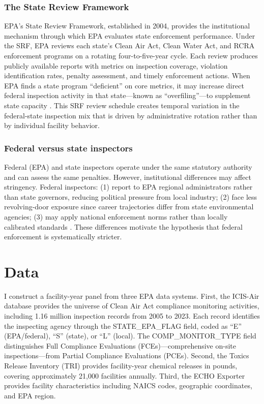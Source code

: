 \documentclass[12pt]{article}
\begin{document}
\subsubsection*{The State Review Framework} EPA's State Review Framework, established in 2004, provides the institutional mechanism through which EPA evaluates state enforcement performance. Under the SRF, EPA reviews each state's Clean Air Act, Clean Water Act, and RCRA enforcement programs on a rotating four-to-five-year cycle. Each review produces publicly available reports with metrics on inspection coverage, violation identification rates, penalty assessment, and timely enforcement actions. When EPA finds a state program ``deficient'' on core metrics, it may increase direct federal inspection activity in that state---known as ``overfiling''---to supplement state capacity \citep{gaynor2016cooperative}. This SRF review schedule creates temporal variation in the federal-state inspection mix that is driven by administrative rotation rather than by individual facility behavior.

\subsubsection*{Federal versus state inspectors} Federal (EPA) and state inspectors operate under the same statutory authority and can assess the same penalties. However, institutional differences may affect stringency. Federal inspectors: (1) report to EPA regional administrators rather than state governors, reducing political pressure from local industry; (2) face less revolving-door exposure since career trajectories differ from state environmental agencies; (3) may apply national enforcement norms rather than locally calibrated standards \citep{mintz2012enforcement}. These differences motivate the hypothesis that federal enforcement is systematically stricter.


\section{Data}

I construct a facility-year panel from three EPA data systems. First, the ICIS-Air database provides the universe of Clean Air Act compliance monitoring activities, including 1.16 million inspection records from 2005 to 2023. Each record identifies the inspecting agency through the STATE\_EPA\_FLAG field, coded as ``E'' (EPA/federal), ``S'' (state), or ``L'' (local). The COMP\_MONITOR\_TYPE field distinguishes Full Compliance Evaluations (FCEs)---comprehensive on-site inspections---from Partial Compliance Evaluations (PCEs). Second, the Toxics Release Inventory (TRI) provides facility-year chemical releases in pounds, covering approximately 21,000 facilities annually. Third, the ECHO Exporter provides facility characteristics including NAICS codes, geographic coordinates, and EPA region.
\end{document}
